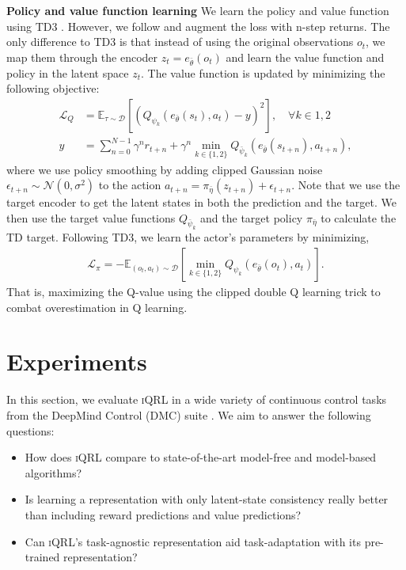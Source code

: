 \documentclass{article}
\theoremstyle{plain}
\theoremstyle{definition}
\theoremstyle{remark}
\newcommand{\our}{\textsc{iQRL}\xspace}
\newcommand{\E}{\mathbb{E}}
\begin{document}
\textbf{Policy and value function learning}
We learn the policy and value function using TD3 \citep{fujimotoAddressingFunctionApproximation2018}.
However, we follow \citet{yaratsMasteringVisualContinuous2021,zhaoSimplifiedTemporalConsistency2023}
and augment the loss with n-step returns.
The only difference to TD3 is that instead of using the original observations $o_{t}$, we map them through the
encoder $z_{t} = e_{\bar{\theta}}(o_{t})$ and learn the value function and policy in the latent space $z_{t}$.
The value function is updated by minimizing the following objective:
\begin{align} \label{eq:value-loss}
  \mathcal{L}_{Q} &= \E_{\tau \sim \mathcal{D}} \left[ (Q_{\psi_{k}}(e_{\bar{\theta}}(s_{t}), a_{t}) - y)^{2}  \right], \quad  \forall k \in 1, 2 \\
  y &= \sum_{n=0}^{N-1} \gamma^{n} r_{t+n} + \gamma^{n} \min_{k \in \{1,2\}} Q_{\bar{\psi}_{k}}(e_{\bar{\theta}}(s_{t+n}), a_{t+n}), \nonumber
\end{align}
where we use policy smoothing by adding clipped Gaussian noise $\epsilon_{t+n} \sim \mathcal{N} (0,\sigma^{2})$ to the
action $a_{t+n} = \pi_{\bar{\eta}}(z_{t+n}) + \epsilon_{t+n}$.
Note that we use the target encoder to get the latent states in both the prediction and the target.
We then use the target value functions $Q_{\bar{\psi}_{k}}$ and the target policy $\pi_{\bar{\eta}}$ to calculate the TD target.
Following TD3, we learn the actor's parameters by minimizing,
%
\begin{align} \label{eq:policy-loss}
 \mathcal{L}_{\pi} = - \E_{(o_{t}, a_{t}) \sim \mathcal{D}} \left[ \min_{k\in\{1,2\}} Q_{\psi_{k}}(e_{\bar{\theta}}(o_{t}), a_{t}) \right].
\end{align}
%
That is, maximizing the Q-value using the clipped double Q learning trick to combat overestimation in Q learning.






\section{Experiments}
\label{sec:experiments}
In this section, we evaluate \our in a wide variety of continuous control tasks from the DeepMind Control (DMC) suite \cite{tassa2018deepmind}.
We aim to answer the following questions:
\begin{itemize}
    \item How does \our compare to state-of-the-art model-free and model-based algorithms?
    \item Is learning a representation with only latent-state consistency really better than including reward predictions and value predictions?
    \item Can \our's task-agnostic representation aid task-adaptation with its pre-trained representation?
\end{itemize}
\end{document}
